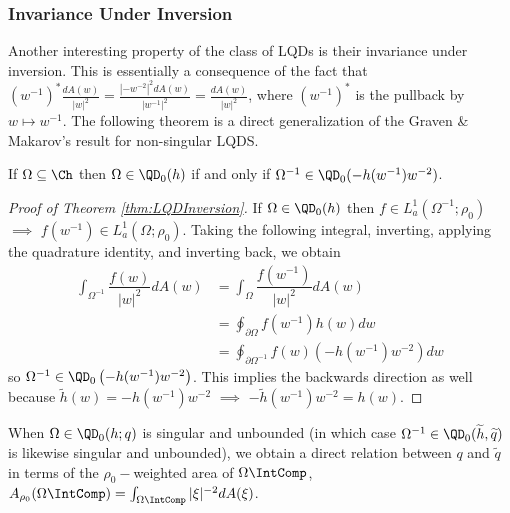 \documentclass{article}
\numberwithin{equation}{section}
\begin{document}
\subsubsection{Invariance Under Inversion}\label{subsubsec:InversionInvariance}
Another interesting property of the class of LQDs is their invariance under inversion. This is essentially a consequence of the fact that $(w^{-1})^{\ast}\frac{dA(w)}{|w|^2}=\frac{|-w^{-2}|^2dA(w)}{|w^{-1}|^2}=\frac{dA(w)}{|w|^2}$, where $(w^{-1})^{\ast}$ is the pullback by $w\mapsto w^{-1}$. The following theorem is a direct generalization of the Graven \& Makarov's \cite{GravenMakarov2025} result for non-singular LQDS.
\begin{theorem}\label{thm:LQDInversion}
If $\Omega\subseteq\Ch$ then $\Omega\in\QD_0(h)$ if and only if $\Omega^{-1}\in\QD_0(-h(w^{-1})w^{-2})$.
\end{theorem}
\begin{proof}[Proof of Theorem \ref{thm:LQDInversion}]
If $\Omega\in\QD_0(h)$ then $f\in L_a^1(\Omega^{-1};\rho_0)$ $\implies$ $f(w^{-1})\in L_a^1(\Omega;\rho_0)$. Taking the following integral, inverting, applying the quadrature identity, and inverting back, we obtain
\begin{align*}
\int_{\Omega^{-1}}\dfrac{f(w)}{|w|^2}dA(w)&=\int_{\Omega}\dfrac{f(w^{-1})}{|w|^2}dA(w)\\
&=\oint_{\partial\Omega}f(w^{-1})h(w)dw\\
&=\oint_{\partial\Omega^{-1}}f(w)(-h(w^{-1})w^{-2})dw
\end{align*}
so $\Omega^{-1}\in\QD_0\left(-h(w^{-1})w^{-2}\right)$. This implies the backwards direction as well because $\widetilde{h}(w)=-h(w^{-1})w^{-2}$ $\implies$ $-\widetilde{h}(w^{-1})w^{-2}=h(w)$.
\end{proof}

When $\Omega\in\QD_0(h;q)$ is singular and unbounded (in which case $\Omega^{-1}\in\QD_0(\widetilde{h},\widetilde{q})$ is likewise singular and unbounded), we obtain a direct relation between $q$ and $\widetilde{q}$ in terms of the $\rho_0-$weighted area of $\Omega\IntComp$, $A_{\rho_0}(\Omega\IntComp)=\int_{\Omega\IntComp}|\xi|^{-2}dA(\xi)$.
\end{document}
